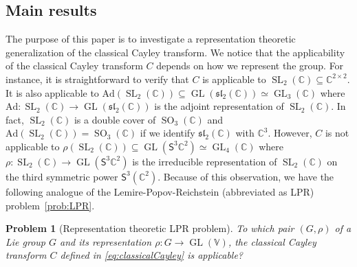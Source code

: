 \documentclass[11pt,reqno]{amsart}
\DeclareMathOperator{\GL}{GL}
\DeclareMathOperator{\SL}{SL}
\DeclareMathOperator{\SO}{SO}
\newtheorem{problem}[theorem]{Problem}
\newcommand{\Ad}{\mathrm{Ad}}
\begin{document}
\subsection*{Main results} The purpose of this paper is to investigate a representation theoretic generalization of the classical Cayley transform.  We notice that the applicability of the classical Cayley transform $C$ depends on how we represent the group.  For instance,  it is straightforward to verify that $C$ is applicable to $\SL_2(\mathbb{C}) \subseteq \mathbb{C}^{2 \times 2}$.  It is also applicable to $\Ad(\SL_2(\mathbb{C})) \subseteq \GL(\mathfrak{sl}_2(\mathbb{C})) \simeq \GL_3(\mathbb{C})$ where $\Ad: \SL_2(\mathbb{C}) \to \GL(\mathfrak{sl}_2(\mathbb{C}))$ is the adjoint representation of $\SL_2(\mathbb{C})$.  In fact,  $\SL_2(\mathbb{C})$ is a double cover of $\SO_3(\mathbb{C})$ and $\Ad(\SL_2(\mathbb{C})) = \SO_3(\mathbb{C})$ if we identify $\mathfrak{sl}_2(\mathbb{C})$ with $\mathbb{C}^3$.  However,  $C$ is not applicable to $\rho(\SL_2(\mathbb{C})) \subseteq \GL\left( \mathsf{S}^3\mathbb{C}^2 \right) \simeq \GL_4(\mathbb{C})$ where $\rho: \SL_2(\mathbb{C}) \to \GL(\mathsf{S}^3 \mathbb{C}^2)$ is the irreducible representation of $\SL_2(\mathbb{C})$ on the third symmetric power $\mathsf{S}^3(\mathbb{C}^2)$.  Because of this observation,  we have the following analogue of the Lemire-Popov-Reichstein (abbreviated as LPR) problem~\ref{prob:LPR}.
\begin{problem}[Representation theoretic LPR problem]
\label{prob:LPR-rep}
To which pair $(G,\rho)$ of a Lie group $G$ and its representation $\rho: G\to \GL(\mathbb{V})$,  the classical Cayley transform $C$ defined in \eqref{eq:classicalCayley} is applicable?
\end{problem}
\end{document}
